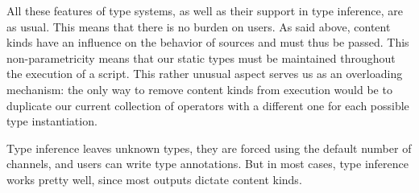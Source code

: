 All these features of type systems, as well as their support in
type inference, are as usual.
This means that there is no burden on users.
As said above, content kinds have an influence on the behavior
of sources and must thus be passed. This non-parametricity
means that our static types must be maintained throughout
the execution of a script. This rather unusual aspect serves
us as an overloading mechanism: the only way to remove
content kinds from execution would be to duplicate our current
collection of operators with a different one for each possible
type instantiation.

Type inference leaves unknown types, they are forced using the default
number of channels, and users can write type annotations.
But in most cases, type inference works pretty well, since most
outputs dictate content kinds.
